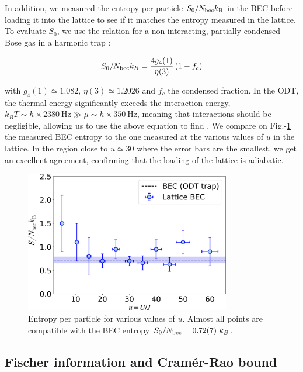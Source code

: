 In addition, we measured the entropy per particle $S_0/N_{\rm{bec}} k_{\mathrm{B}}$ in the BEC before loading it into the lattice  to see if it matches the entropy measured in the lattice. To evaluate $S_0$, we use the relation for a non-interacting, partially-condensed Bose gas in a harmonic trap \cite{pitaevskii2016bose}:

\begin{equation}
    S_{0} / N_{\rm{bec}} k_{B}=\frac{4 g_{4}(1)}{\eta(3)}\left(1-f_{c}\right)
\end{equation}

\noindent with $g_{4}(1) \simeq 1.082$, $\eta(3) \simeq 1.2026$ and $f_c$ the condensed fraction. In the ODT, the thermal energy significantly exceeds the interaction energy, $k_{B} T \sim h \times 2380 \mathrm{~Hz} \gg \mu \sim h \times 350 \mathrm{~Hz}$, meaning that interactions should be negligible, allowing us to use the above equation to find . We compare on Fig.-\ref{fig:entropy_BEC} the measured BEC entropy to the one measured at the various values of $u$ in the lattice. In the region close to $u \simeq 30$ where the error bars are the smallest, we get an excellent agreement, confirming that the loading of the lattice is adiabatic.

\begin{figure}
    \centering
    \includegraphics[width=0.8\textwidth]{Fig/Chapter3/entropy_BEC.png}
    \caption[Entropy per particle for various values of $u$]{Entropy per particle for various values of $u$. Almost all points are compatible with the BEC entropy $S_{0} / \NBEC= 0.72(7) \ k_{B}$.}
    \label{fig:entropy_BEC}
\end{figure}




\subsection{Fischer information and Cramér-Rao bound}

